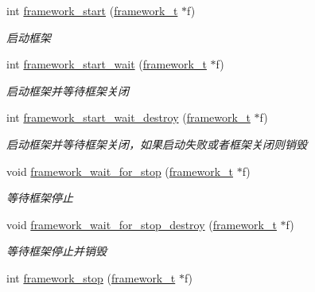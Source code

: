 \begin{DoxyCompactItemize}
int \hyperlink{a00102_ga23293faa7cc7d9f88ec73d4430a2355e_ga23293faa7cc7d9f88ec73d4430a2355e}{framework\+\_\+start} (\hyperlink{a00050_a6149d769f6f07ed14a40a271c95d8463_a6149d769f6f07ed14a40a271c95d8463}{framework\+\_\+t} $\ast$f)
\begin{DoxyCompactList}\small\item\em 启动框架 \end{DoxyCompactList}\item 
int \hyperlink{a00102_ga5fb7151fc13ce397884a7673b4fd319b_ga5fb7151fc13ce397884a7673b4fd319b}{framework\+\_\+start\+\_\+wait} (\hyperlink{a00050_a6149d769f6f07ed14a40a271c95d8463_a6149d769f6f07ed14a40a271c95d8463}{framework\+\_\+t} $\ast$f)
\begin{DoxyCompactList}\small\item\em 启动框架并等待框架关闭 \end{DoxyCompactList}\item 
int \hyperlink{a00102_ga4af709f98e2bd206da043cc29f915c99_ga4af709f98e2bd206da043cc29f915c99}{framework\+\_\+start\+\_\+wait\+\_\+destroy} (\hyperlink{a00050_a6149d769f6f07ed14a40a271c95d8463_a6149d769f6f07ed14a40a271c95d8463}{framework\+\_\+t} $\ast$f)
\begin{DoxyCompactList}\small\item\em 启动框架并等待框架关闭，如果启动失败或者框架关闭则销毁 \end{DoxyCompactList}\item 
void \hyperlink{a00102_gaefec7da1b548ddb97c73c8924ba17069_gaefec7da1b548ddb97c73c8924ba17069}{framework\+\_\+wait\+\_\+for\+\_\+stop} (\hyperlink{a00050_a6149d769f6f07ed14a40a271c95d8463_a6149d769f6f07ed14a40a271c95d8463}{framework\+\_\+t} $\ast$f)
\begin{DoxyCompactList}\small\item\em 等待框架停止 \end{DoxyCompactList}\item 
void \hyperlink{a00102_gada1de96de1586411c77b5357a7b2376a_gada1de96de1586411c77b5357a7b2376a}{framework\+\_\+wait\+\_\+for\+\_\+stop\+\_\+destroy} (\hyperlink{a00050_a6149d769f6f07ed14a40a271c95d8463_a6149d769f6f07ed14a40a271c95d8463}{framework\+\_\+t} $\ast$f)
\begin{DoxyCompactList}\small\item\em 等待框架停止并销毁 \end{DoxyCompactList}\item 
int \hyperlink{a00102_ga429be76d09278d6170f1b519f4dbb689_ga429be76d09278d6170f1b519f4dbb689}{framework\+\_\+stop} (\hyperlink{a00050_a6149d769f6f07ed14a40a271c95d8463_a6149d769f6f07ed14a40a271c95d8463}{framework\+\_\+t} $\ast$f)

\end{DoxyCompactItemize}

